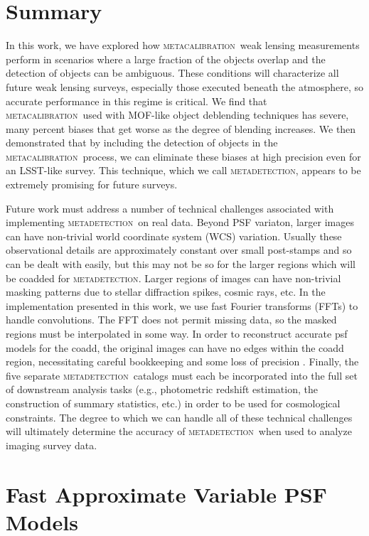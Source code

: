 \documentclass[fleqn,useAMS,usenatbib]{mnras}
\newcommand{\mcal}{\textsc{metacalibration}}
\newcommand{\mdet}{\textsc{metadetection}}
\begin{document}
\section{Summary}\label{sec:conc}

In this work, we have explored how \mcal\ weak lensing measurements perform in
scenarios where a large fraction of the objects overlap and the detection of
objects can be ambiguous. These conditions will characterize all future weak
lensing surveys, especially those executed beneath the atmosphere, so accurate
performance in this regime is critical. We find that \mcal\ used with MOF-like
object deblending techniques has severe, many percent biases that get worse as
the degree of blending increases. We then demonstrated that by including the
detection of objects in the \mcal\ process, we can eliminate these biases at
high precision even for an LSST-like survey. This technique, which we call
\mdet, appears to be extremely promising for future surveys.

Future work must address a number of technical challenges associated with
implementing \mdet\ on real data. Beyond PSF variaton, larger images can have
non-trivial world coordinate system (WCS) variation.  Usually these
observational details are approximately constant over small post-stamps and so
can be dealt with easily, but this may not be so for the larger regions which
will be coadded for \mdet. Larger regions of images can have non-trivial
masking patterns due to stellar diffraction spikes, cosmic rays, etc. In the
implementation presented in this work, we use fast Fourier transforms (FFTs) to
handle convolutions. The FFT does not permit missing data, so the masked
regions must be interpolated in some way.  In order to reconstruct accurate psf
models for the coadd, the original images can have no edges within the coadd
region, necessitating careful bookkeeping and some loss of precision
\citep{ArmstrongCoadd}.  Finally, the five separate \mdet\ catalogs must each
be incorporated into the full set of downstream analysis tasks (e.g.,
photometric redshift estimation, the construction of summary statistics, etc.)
in order to be used for cosmological constraints. The degree to which we can
handle all of these technical challenges will ultimately determine the accuracy
of \mdet\ when used to analyze imaging survey data.




\appendix

\section{Fast Approximate Variable PSF Models}\label{app:pspsf}
\end{document}
